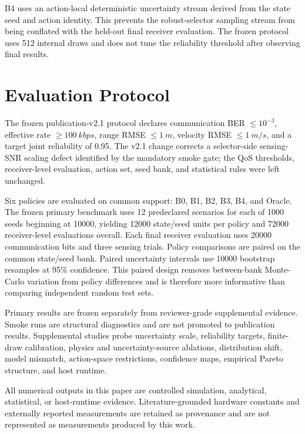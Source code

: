 \documentclass[journal]{IEEEtran}
\begin{document}
B4 uses an action-local deterministic uncertainty stream derived from the state seed and action identity. This prevents the robust-selector sampling stream from being conflated with the held-out final receiver evaluation. The frozen protocol uses 512 internal draws and does not tune the reliability threshold after observing final results.

\section{Evaluation Protocol}
\label{sec:protocol}
The frozen publication-v2.1 protocol declares communication BER $\le10^{-3}$, effective rate $\ge\SI{100}{kbps}$, range RMSE $\le\SI{1}{m}$, velocity RMSE $\le\SI{1}{m/s}$, and a target joint reliability of 0.95. The v2.1 change corrects a selector-side sensing-SNR scaling defect identified by the mandatory smoke gate; the QoS thresholds, receiver-level evaluation, action set, seed bank, and statistical rules were left unchanged.

Six policies are evaluated on common support: B0, B1, B2, B3, B4, and Oracle. The frozen primary benchmark uses 12 predeclared scenarios for each of 1000 seeds beginning at 10000, yielding 12000 state/seed units per policy and 72000 receiver-level evaluations overall. Each final receiver evaluation uses 20000 communication bits and three sensing trials. Policy comparisons are paired on the common state/seed bank. Paired uncertainty intervals use 10000 bootstrap resamples at 95\% confidence. This paired design removes between-bank Monte-Carlo variation from policy differences and is therefore more informative than comparing independent random test sets.

Primary results are frozen separately from reviewer-grade supplemental evidence. Smoke runs are structural diagnostics and are not promoted to publication results. Supplemental studies probe uncertainty scale, reliability targets, finite-draw calibration, physics and uncertainty-source ablations, distribution shift, model mismatch, action-space restrictions, confidence maps, empirical Pareto structure, and host runtime.

All numerical outputs in this paper are controlled simulation, analytical, statistical, or host-runtime evidence. Literature-grounded hardware constants and externally reported measurements are retained as provenance and are not represented as measurements produced by this work.

\figFrozenPolicies
\end{document}
